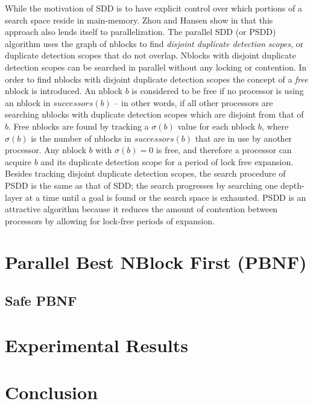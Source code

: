 \documentclass{article} \usepackage{aaai} \usepackage{graphicx}
\begin{document}
While the motivation of SDD is to have explicit control over which
portions of a search space reside in main-memory.  Zhou and Hansen
show in \cite{zhou:psd} that this approach also lends itself to
parallelization.  The parallel SDD (or PSDD) algorithm uses the graph
of nblocks to find \emph{disjoint duplicate detection scopes}, or
duplicate detection scopes that do not overlap.  Nblocks with disjoint
duplicate detection scopes can be searched in parallel without any
locking or contention.  In order to find nblocks with disjoint
duplicate detection scopes the concept of a \emph{free} nblock is
introduced.  An nblock $b$ is considered to be free if no processor is
using an nblock in $successors(b)$ -- in other words, if all other
processors are searching nblocks with duplicate detection scopes which
are disjoint from that of $b$.  Free nblocks are found by tracking a
$\sigma(b)$ value for each nblock $b$, where $\sigma(b)$ is the number
of nblocks in $successors(b)$ that are in use by another processor.
Any nblock $b$ with $\sigma(b) = 0$ is free, and therefore a processor
can acquire $b$ and its duplicate detection scope for a period of lock
free expansion.  Besides tracking disjoint duplicate detection scopes,
the search procedure of PSDD is the same as that of SDD; the search
progresses by searching one depth-layer at a time until a goal is
found or the search space is exhausted.  PSDD is an attractive
algorithm because it reduces the amount of contention between
processors by allowing for lock-free periods of expansion.


\section{Parallel Best NBlock First (PBNF)}
\subsection{Safe PBNF}
\section{Experimental Results}
\section{Conclusion}



\end{document}
